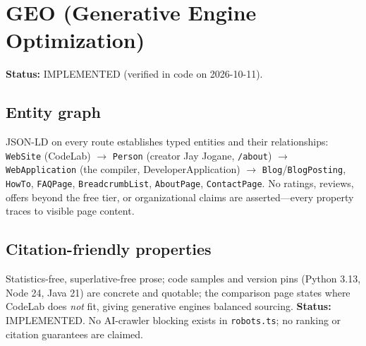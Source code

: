 \section{GEO (Generative Engine Optimization)}
\label{sec:geo}

\textbf{Status:} IMPLEMENTED (verified in code on 2026-10-11).

\subsection{Entity graph}
JSON-LD on every route establishes typed entities and their relationships: \texttt{WebSite} (CodeLab) $\rightarrow$ \texttt{Person} (creator Jay Jogane, \texttt{/about}) $\rightarrow$ \texttt{WebApplication} (the compiler, DeveloperApplication) $\rightarrow$ \texttt{Blog}/\texttt{BlogPosting}, \texttt{HowTo}, \texttt{FAQPage}, \texttt{BreadcrumbList}, \texttt{AboutPage}, \texttt{ContactPage}. No ratings, reviews, offers beyond the free tier, or organizational claims are asserted---every property traces to visible page content.

\subsection{Citation-friendly properties}
Statistics-free, superlative-free prose; code samples and version pins (Python 3.13, Node 24, Java 21) are concrete and quotable; the comparison page states where CodeLab does \textit{not} fit, giving generative engines balanced sourcing. \textbf{Status:} IMPLEMENTED. No AI-crawler blocking exists in \texttt{robots.ts}; no ranking or citation guarantees are claimed.
